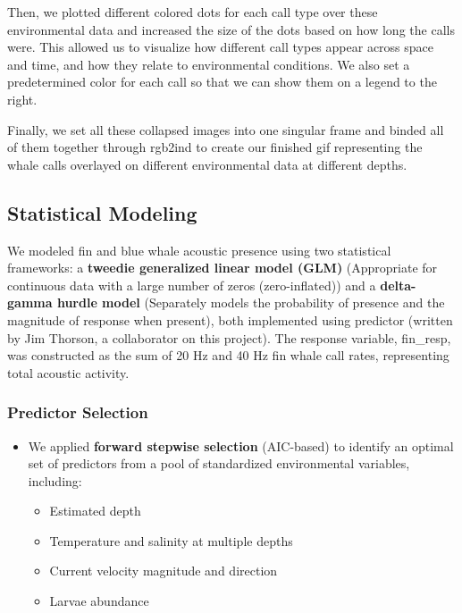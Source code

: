 \documentclass[
]{article}
\providecommand{\tightlist}{%
  \setlength{\itemsep}{0pt}\setlength{\parskip}{0pt}}
\begin{document}
Then, we plotted different colored dots for each call type over these
environmental data and increased the size of the dots based on how long
the calls were. This allowed us to visualize how different call types
appear across space and time, and how they relate to environmental
conditions. We also set a predetermined color for each call so that we
can show them on a legend to the right.

Finally, we set all these collapsed images into one singular frame and
binded all of them together through rgb2ind to create our finished gif
representing the whale calls overlayed on different environmental data
at different depths.

\subsection{Statistical Modeling}\label{statistical-modeling}

We modeled fin and blue whale acoustic presence using two statistical
frameworks: a \textbf{tweedie generalized linear model (GLM)}
(Appropriate for continuous data with a large number of zeros
(zero-inflated)) and a \textbf{delta-gamma hurdle model} (Separately
models the probability of presence and the magnitude of response when
present), both implemented using predictor (written by Jim Thorson, a
collaborator on this project). The response variable, fin\_resp, was
constructed as the sum of 20 Hz and 40 Hz fin whale call rates,
representing total acoustic activity.

\subsubsection{Predictor Selection}\label{predictor-selection}

\begin{itemize}
\tightlist
\item
  We applied \textbf{forward stepwise selection} (AIC-based) to identify
  an optimal set of predictors from a pool of standardized environmental
  variables, including:

  \begin{itemize}
  \tightlist
  \item
    Estimated depth
  \item
    Temperature and salinity at multiple depths
  \item
    Current velocity magnitude and direction
  \item
    Larvae abundance
  \end{itemize}
\end{itemize}
\end{document}
